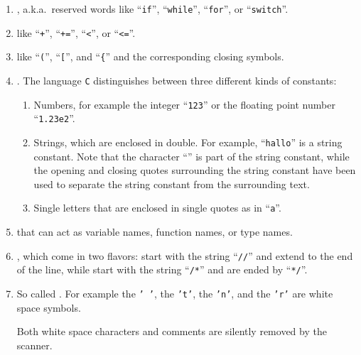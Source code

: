 \begin{enumerate}
\item {}, a.k.a.~reserved words like ``\texttt{if}'', ``\texttt{while}'', ``\texttt{for}'', or
      ``\texttt{switch}''.
\item {} like ``\texttt{+}'', ``\texttt{+=}'', ``\texttt{<}'', or
      ``\texttt{<=}''. 
\item {} like ``\texttt{(}'', ``\texttt{[}'', and ``\texttt{\{}'' and the
      corresponding closing symbols.
\item {}.  The language \texttt{C} distinguishes between three different kinds of constants:
      \begin{enumerate}
      \item Numbers, for example the integer ``\texttt{123}'' or the floating point number ``\texttt{1.23e2}''.
      \item Strings, which are enclosed in double.  For example,
            ``\texttt{hallo}'' is a string constant.  Note that the character
            ``\texttt{}'' is part of the string constant, while the opening and closing
            quotes surrounding the string constant have been used to separate the string constant
            from the surrounding text. 
      \item Single letters that are enclosed in single quotes as in
            ``\texttt{a}''.
      \end{enumerate}
\item {} that can act as variable names, function names, or type names.
\item {}, which come in two flavors:   start with the string
      ``\texttt{//}'' and extend to the end of the line, while  start with
      the string ``\texttt{/*}'' and are ended by ``\texttt{*/}''.
\item So called .  For example the  \texttt{' '},
      the  \texttt{'t'}, the  \texttt{'n'}, and the
       \texttt{'r'} are white space symbols.

      Both white space characters and comments are silently removed by the scanner.
\end{enumerate}

